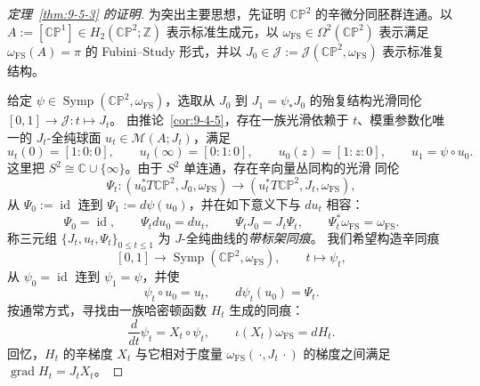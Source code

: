 \begin{proof}[定理~\ref{thm:9-5-3} 的证明]
为突出主要思想，先证明 $\mathbb{CP}^2$ 的辛微分同胚群连通。以
$A:=[\mathbb{CP}^1]\in H_2(\mathbb{CP}^2;\mathbb Z)$ 表示标准生成元，以
$\omega_{\mathrm{FS}}\in\Omega^2(\mathbb{CP}^2)$ 表示满足
$\omega_{\mathrm{FS}}(A)=\pi$ 的 Fubini--Study 形式，并以
$J_0\in\mathcal J:=\mathcal J(\mathbb{CP}^2,\omega_{\mathrm{FS}})$ 表示标准复结构。

给定 $\psi\in\operatorname{Symp}(\mathbb{CP}^2,\omega_{\mathrm{FS}})$，选取从 $J_0$ 到
$J_1=\psi_*J_0$ 的殆复结构光滑同伦
$[0,1]\to\mathcal J:t\mapsto J_t$。
由推论~\ref{cor:9-4-5}，存在一族光滑依赖于 $t$、模重参数化唯一的 $J_t$-全纯球面
$u_t\in\mathcal M(A;J_t)$，满足
\[
  u_t(0)=[1:0:0],
  \qquad u_t(\infty)=[0:1:0],
  \qquad u_0(z)=[1:z:0],
  \qquad u_1=\psi\circ u_0.
\]
这里把 $S^2\cong\mathbb C\cup\{\infty\}$。由于 $S^2$ 单连通，存在辛向量丛同构的光滑
同伦
\[
  \Psi_t:(u_0^*T\mathbb{CP}^2,J_0,\omega_{\mathrm{FS}})
  \longrightarrow(u_t^*T\mathbb{CP}^2,J_t,\omega_{\mathrm{FS}}),
\]
从 $\Psi_0:=\operatorname{id}$ 连到 $\Psi_1:=d\psi(u_0)$，并在如下意义下与 $du_t$ 相容：
\begin{equation}\label{eq:9-5-3}
  \Psi_0=\operatorname{id},
  \qquad \Psi_tdu_0=du_t,
  \qquad \Psi_tJ_0=J_t\Psi_t,
  \qquad \Psi_t^*\omega_{\mathrm{FS}}=\omega_{\mathrm{FS}}.
\end{equation}
称三元组 $\{J_t,u_t,\Psi_t\}_{0\le t\le1}$ 为 $J$-全纯曲线的\emph{带标架同痕}。
我们希望构造辛同痕
\[
  [0,1]\longrightarrow\operatorname{Symp}(\mathbb{CP}^2,\omega_{\mathrm{FS}}),
  \qquad t\longmapsto\psi_t,
\]
从 $\psi_0=\operatorname{id}$ 连到 $\psi_1=\psi$，并使
\begin{equation}\label{eq:9-5-4}
  \psi_t\circ u_0=u_t,
  \qquad d\psi_t(u_0)=\Psi_t.
\end{equation}
按通常方式，寻找由一族哈密顿函数 $H_t$ 生成的同痕：
\begin{equation}\label{eq:9-5-5}
  \frac d{dt}\psi_t=X_t\circ\psi_t,
  \qquad \iota(X_t)\omega_{\mathrm{FS}}=dH_t.
\end{equation}
回忆，$H_t$ 的辛梯度 $X_t$ 与它相对于度量
$\omega_{\mathrm{FS}}(\,·,J_t\,·)$ 的梯度之间满足
$\operatorname{grad}H_t=J_tX_t$。


\end{proof}
